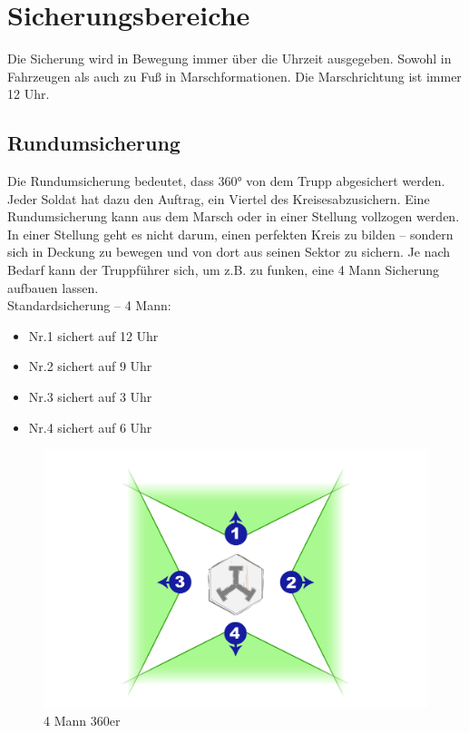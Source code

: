 \newpage

\section{Sicherungsbereiche}
	Die Sicherung wird in Bewegung immer über die Uhrzeit ausgegeben. Sowohl in Fahrzeugen als auch zu Fuß in Marschformationen.  Die Marschrichtung ist immer 12 Uhr. \\

\subsection{Rundumsicherung}
	Die Rundumsicherung bedeutet, dass 360° von dem Trupp abgesichert werden. Jeder Soldat hat dazu den Auftrag, ein Viertel des \glqq Kreises\grqq abzusichern. Eine Rundumsicherung kann aus dem Marsch oder in einer Stellung vollzogen werden. In einer Stellung geht es nicht darum, einen perfekten Kreis zu bilden – sondern sich in Deckung zu bewegen und von dort aus seinen Sektor zu sichern. Je nach Bedarf kann der Truppführer sich, um z.B. zu funken, eine 4 Mann Sicherung aufbauen lassen. \\
	Standardsicherung  – 4 Mann: 
		\begin{itemize}
			\item Nr.1 sichert auf 12 Uhr 
			\item Nr.2 sichert auf 9 Uhr 
			\item Nr.3 sichert auf 3 Uhr 
			\item Nr.4 sichert auf 6 Uhr 
		\end{itemize}

		\begin{figure}[htbp]
			\centering
			\includegraphics[width=15cm]{./img/grundlagen/sicherungen/360grad_sicherung_4mann.jpg}
			\caption{4 Mann 360er}
		\end{figure}

